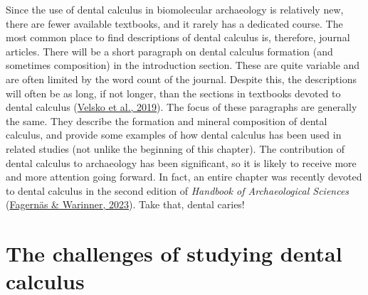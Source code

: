 \documentclass[
  b5paper,
]{book}
\begin{document}
Since the use of dental calculus in biomolecular archaeology is
relatively new, there are fewer available textbooks, and it rarely has a
dedicated course. The most common place to find descriptions of dental
calculus is, therefore, journal articles. There will be a short
paragraph on dental calculus formation (and sometimes composition) in
the introduction section. These are quite variable and are often limited
by the word count of the journal. Despite this, the descriptions will
often be as long, if not longer, than the sections in textbooks devoted
to dental calculus
(\protect\hyperlink{ref-velskoMicrobialDifferences2019}{Velsko et al.,
2019}). The focus of these paragraphs are generally the same. They
describe the formation and mineral composition of dental calculus, and
provide some examples of how dental calculus has been used in related
studies (not unlike the beginning of this chapter). The contribution of
dental calculus to archaeology has been significant, so it is likely to
receive more and more attention going forward. In fact, an entire
chapter was recently devoted to dental calculus in the second edition of
\emph{Handbook of Archaeological Sciences}
(\protect\hyperlink{ref-fagernasDentalCalculus2023}{Fagernäs \&
Warinner, 2023}). Take that, dental caries!

\hypertarget{the-challenges-of-studying-dental-calculus}{%
\section{The challenges of studying dental
calculus}\label{the-challenges-of-studying-dental-calculus}}
\end{document}

